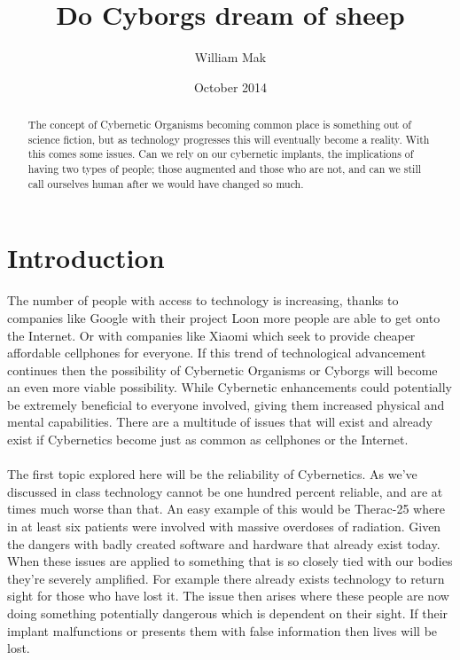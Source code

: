 \documentclass[12pt,a4paper,notitlepage]{article}
\title{Do Cyborgs dream of sheep}
\author{William Mak}
\date{October 2014}
\begin{document}
\maketitle
\begin{abstract}
	The concept of Cybernetic Organisms becoming common place is something out
of science fiction, but as technology progresses this will eventually become a 
reality. With this comes some issues. Can we rely on our cybernetic implants,
the implications of having two types of people; those augmented and those who
are not, and can we still call ourselves human after we would have changed so 
much.
\end{abstract}

\section{Introduction}
    The number of people with access to technology is increasing, thanks to 
companies like Google with their project Loon more people are able to get onto
the Internet. Or with companies like Xiaomi which seek to provide cheaper
affordable cellphones for everyone. If this trend of technological advancement 
continues then the possibility of Cybernetic Organisms or Cyborgs will become an
even more viable possibility. While Cybernetic enhancements could potentially be
extremely beneficial to everyone involved, giving them increased physical and
mental capabilities. There are a multitude of issues that will exist and already
exist if Cybernetics become just as common as cellphones or the Internet.
\\\\
    The first topic explored here will be the reliability of Cybernetics. As
we've discussed in class technology cannot be one hundred percent reliable, and 
are at times much worse than that. An easy example of this would be Therac-25
where in at least six patients were involved with massive overdoses of radiation.
Given the dangers with badly created software and hardware that already exist
today. When these issues are applied to something that is so closely tied with
our bodies they're severely amplified. For example there already exists
technology to return sight for those who have lost it. The issue then arises 
where these people are now doing something potentially dangerous which is
dependent on their sight. If their implant malfunctions or presents them with 
false information then lives will be lost.
\\\\
\end{document}
